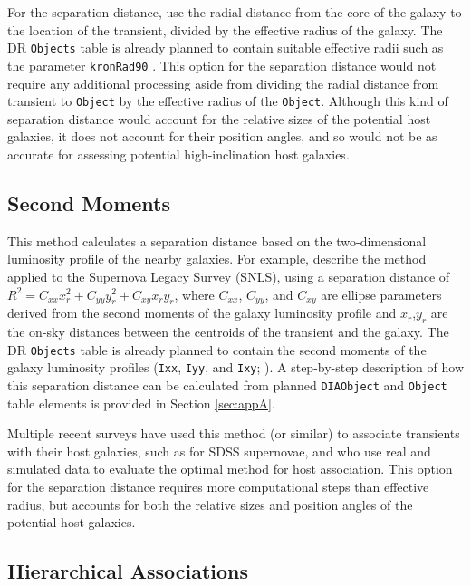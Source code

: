 \documentclass[DM,authoryear,toc]{lsstdoc}
\begin{document}
For the separation distance, use the radial distance from the core of the galaxy to the location of the transient, divided by the effective radius of the galaxy.
The DR {\tt Objects} table is already planned to contain suitable effective radii such as the parameter {\tt kronRad90} .
This option for the separation distance would not require any additional processing aside from dividing the radial distance from transient to {\tt Object} by the effective radius of the {\tt Object}.
Although this kind of separation distance would account for the relative sizes of the potential host galaxies, it does not account for their position angles, and so would not be as accurate for assessing potential high-inclination host galaxies.

\subsection{Second Moments}\label{ssec:options_mom}

This method calculates a separation distance based on the two-dimensional luminosity profile of the nearby galaxies.
For example, \citet{2006ApJ...648..868S} describe the method applied to the Supernova Legacy Survey (SNLS), using a separation distance of $R^2 = C_{xx} x_r^2 + C_{yy} y_r^2 + C_{xy} x_r y_r$, where $C_{xx}$, $C_{yy}$, and $C_{xy}$ are ellipse parameters derived from the second moments of the galaxy luminosity profile and $x_r$,$y_r$ are the on-sky distances between the centroids of the transient and the galaxy.
The DR {\tt Objects} table is already planned to contain the second moments of the galaxy luminosity profiles ({\tt Ixx}, {\tt Iyy}, and {\tt Ixy}; ).
A step-by-step description of how this separation distance can be calculated from planned {\tt DIAObject} and {\tt Object} table elements is provided in Section \ref{sec:appA}.

Multiple recent surveys have used this method (or similar) to associate transients with their host galaxies, such as \citet{2018PASP..130f4002S} for SDSS supernovae, and \citet{2016AJ....152..154G} who use real and simulated data to evaluate the optimal method for host association.
This option for the separation distance requires more computational steps than effective radius, but accounts for both the relative sizes and position angles of the potential host galaxies. 

\subsection{Hierarchical Associations}
\end{document}
